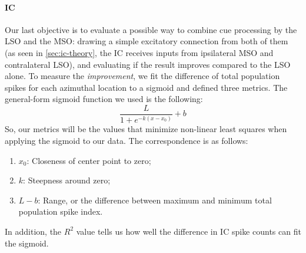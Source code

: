 \documentclass[11pt,a4paper]{article}
\begin{document}
\paragraph{IC}
Our last objective is to evaluate a possible way to combine cue processing by the LSO and the MSO: drawing a simple excitatory connection from both of them (as seen in \ref{sec:ic-theory}, the IC receives inputs from ipsilateral MSO and contralateral LSO), and evaluating if the result improves compared to the LSO alone. To measure the \textit{improvement}, we fit the difference of total population spikes for each azimuthal location to a sigmoid and defined three metrics.
The general-form sigmoid function we used is the following: 
\begin{equation*}
    \frac{L}{1 + e^{-k(x - x_0)}} + b
\end{equation*}
So, our metrics will be the values that minimize non-linear least squares when applying the sigmoid to our data. The correspondence is as follows:
\begin{enumerate}
    \item \textit{$x_0$}: Closeness of center point to zero;
    \item \textit{$k$}: Steepness around zero;
    \item \textit{$L - b$}: Range, or the difference between maximum and minimum total population spike index.
\end{enumerate}
In addition, the $R^2$ value tells us how well the difference in IC spike counts can fit the sigmoid.
\end{document}
